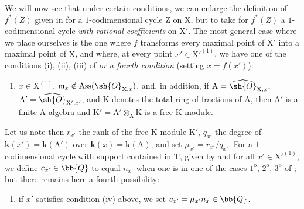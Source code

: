 \begin{env}[21.10.10]
\label{IV.21.10.10}
We will now see that under certain conditions, we can enlarge the definition of $f^*(Z)$ given in  for a $1$-codimensional cycle $\mathrm{Z}$ on $\mathrm{X}$, but to take for $f^*(Z)$ a $1$-codimensional cycle \emph{with rational coefficients} on $\mathrm{X}'$.
The most general case where we place ourselves is the one where $f$ transforms every maximal point of $\mathrm{X}'$ into a maximal point of $\mathrm{X}$, and where, at every point $x'\in\mathrm{X}'^{(1)}$, we have one of the conditions (i), (ii), (iii) of  \emph{or a fourth condition} (setting $x=f(x')$):
\begin{enumerate}
  \item[(iv)] $x\in\mathrm{X}^{(1)}$, $\mathfrak{m}_{x}\notin\operatorname{Ass}(\sh{O}_{\mathrm{X},x})$, and, in addition, if $\mathrm{A}=\widehat{\sh{O}}_{\mathrm{X},x}$, $\mathrm{A}'=\widehat{\sh{O}}_{\mathrm{X}',x'}$, and $\mathrm{K}$ denotes the total ring of fractions of $\mathrm{A}$, then $\mathrm{A}'$ is a finite $\mathrm{A}$-algebra and $\mathrm{K}'=\mathrm{A}'\otimes_{\mathrm{A}}\mathrm{K}$ is a free $\mathrm{K}$-module.
\end{enumerate}

Let us note then $r_{x'}$ the rank of the free $\mathrm{K}$-module $\mathrm{K}'$, $q_{x'}$ the degree of $\boldsymbol{k}(x')=\boldsymbol{k}(\mathrm{A}')$ over $\boldsymbol{k}(x)=\boldsymbol{k}(\mathrm{A})$, and set $\mu_{x'}=r_{x'}/q_{x'}$.
For a $1$-codimensional cycle with support contained in $\mathrm{T}$, given by  and for all $x'\in\mathrm{X}'^{(1)}$, we define $c_{x'}\in\bb{Q}$ to equal $n_{x'}$ when one is in one of the cases $1^{\mathrm{o}}$, $2^{\mathrm{o}}$, $3^{\mathrm{o}}$ of ; but there remains here a fourth possibility:
\begin{enumerate}
  \item[$4^{\mathrm{o}}$] if $x'$ satisfies condition (iv) above, we set $c_{x'}=\mu_{x'}n_x\in\bb{Q}$.
\end{enumerate}
\end{env}

